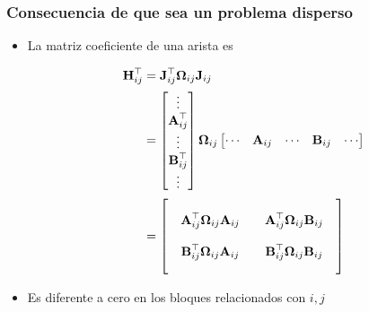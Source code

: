 \begin{frame}
    \frametitle{Consecuencia de que sea un problema disperso}
    
    \begin{itemize}
        \item La matriz coeficiente de una arista es

        \begin{align*}
            \boldsymbol{\mathbf{H}}_{ij}^{\top} &= \boldsymbol{\mathbf{J}}_{ij}^{\top}\boldsymbol{\mathbf{\Omega}}_{ij}\boldsymbol{\mathbf{J}}_{ij}\\
            &= 
            \begin{bmatrix}
                \vdots \\
                \boldsymbol{\mathbf{A}}_{ij}^{\top}\\
                \vdots \\
                \boldsymbol{\mathbf{B}}_{ij}^{\top}\\
                \vdots
            \end{bmatrix} \boldsymbol{\mathbf{\Omega}}_{ij}
            \begin{bmatrix}
                \cdots & \boldsymbol{\mathbf{A}}_{ij} & \cdots & \boldsymbol{\mathbf{B}}_{ij} & \cdots
            \end{bmatrix}\\
            &= 
            \begin{bmatrix}
                & & & &\\
                & \boldsymbol{\mathbf{A}}_{ij}^{\top}\boldsymbol{\mathbf{\Omega}}_{ij}\boldsymbol{\mathbf{A}}_{ij} & & \boldsymbol{\mathbf{A}}_{ij}^{\top}\boldsymbol{\mathbf{\Omega}}_{ij}\boldsymbol{\mathbf{B}}_{ij} & \\
                & & & &\\
                & \boldsymbol{\mathbf{B}}_{ij}^{\top}\boldsymbol{\mathbf{\Omega}}_{ij}\boldsymbol{\mathbf{A}}_{ij} & & \boldsymbol{\mathbf{B}}_{ij}^{\top}\boldsymbol{\mathbf{\Omega}}_{ij}\boldsymbol{\mathbf{B}}_{ij} &\\
                & & & &\\
            \end{bmatrix}
        \end{align*}
        \item Es diferente a cero en los bloques relacionados con $i,j$
    \end{itemize}
    
\end{frame}


